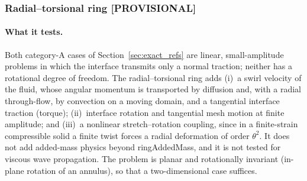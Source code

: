 \subsubsection{Radial--torsional ring [PROVISIONAL]}\label{sec:rotational}


\paragraph{What it tests.}
Both category-A cases of Section~\ref{sec:exact_refs} are linear, small-amplitude problems in which the interface transmits only a normal traction; neither has a rotational degree of freedom.
The radial--torsional ring adds (i)~a swirl velocity of the fluid, whose angular momentum is transported by diffusion and, with a radial through-flow, by convection on a moving domain, and a tangential interface traction (torque); (ii)~interface rotation and tangential mesh motion at finite amplitude; and (iii)~a nonlinear stretch--rotation coupling, since in a finite-strain compressible solid a finite twist forces a radial deformation of order $\theta^2$.
It does not add added-mass physics beyond ringAddedMass, and it is not tested for viscous wave propagation.
The problem is planar and rotationally invariant (in-plane rotation of an annulus), so that a two-dimensional case suffices.

